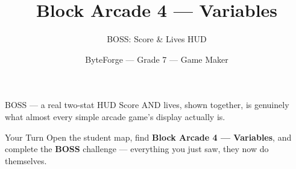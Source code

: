\documentclass[aspectratio=169]{beamer}
\title{Block Arcade 4 — Variables}
\subtitle{BOSS: Score \& Lives HUD}
\author{ByteForge --- Grade 7 --- Game Maker}
\date{}
\begin{document}
\begin{frame}
    \titlepage
\end{frame}

\begin{frame}{BOSS — a real two-stat HUD}
    \Large
    Score AND lives, shown together, is genuinely what almost every simple arcade game's display actually is.

    \begin{center}
    \end{center}
\end{frame}

\begin{frame}{Your Turn}
    \Large
    Open the student map, find \textbf{Block Arcade 4 — Variables}, and complete
    the \textbf{BOSS} challenge --- everything you just saw, they now do themselves.
\end{frame}
\end{document}
